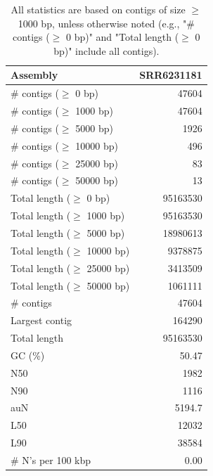 \documentclass[12pt,a4paper]{article}
\begin{document}
\begin{table}[ht]
\begin{center}
\caption{All statistics are based on contigs of size $\geq$ 1000 bp, unless otherwise noted (e.g., "\# contigs ($\geq$ 0 bp)" and "Total length ($\geq$ 0 bp)" include all contigs).}
\begin{tabular}{|l*{1}{|r}|}
\hline
Assembly & SRR6231181 \\ \hline
\# contigs ($\geq$ 0 bp) & 47604 \\ \hline
\# contigs ($\geq$ 1000 bp) & 47604 \\ \hline
\# contigs ($\geq$ 5000 bp) & 1926 \\ \hline
\# contigs ($\geq$ 10000 bp) & 496 \\ \hline
\# contigs ($\geq$ 25000 bp) & 83 \\ \hline
\# contigs ($\geq$ 50000 bp) & 13 \\ \hline
Total length ($\geq$ 0 bp) & 95163530 \\ \hline
Total length ($\geq$ 1000 bp) & 95163530 \\ \hline
Total length ($\geq$ 5000 bp) & 18980613 \\ \hline
Total length ($\geq$ 10000 bp) & 9378875 \\ \hline
Total length ($\geq$ 25000 bp) & 3413509 \\ \hline
Total length ($\geq$ 50000 bp) & 1061111 \\ \hline
\# contigs & 47604 \\ \hline
Largest contig & 164290 \\ \hline
Total length & 95163530 \\ \hline
GC (\%) & 50.47 \\ \hline
N50 & 1982 \\ \hline
N90 & 1116 \\ \hline
auN & 5194.7 \\ \hline
L50 & 12032 \\ \hline
L90 & 38584 \\ \hline
\# N's per 100 kbp & 0.00 \\ \hline
\end{tabular}
\end{center}
\end{table}
\end{document}
